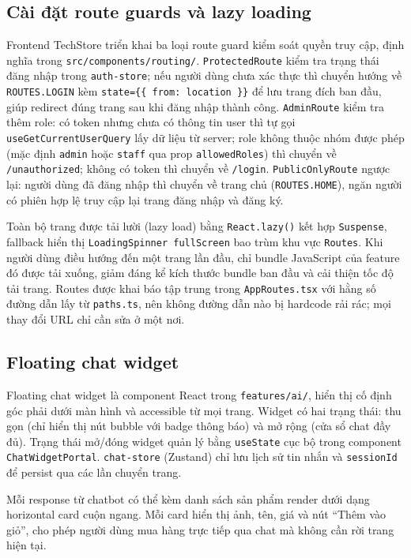 \subsection{Cài đặt route guards và lazy loading}
\label{sec:c4_route_guards}

Frontend TechStore triển khai ba loại route guard kiểm soát quyền truy cập, định nghĩa trong \texttt{src/components/routing/}. \texttt{ProtectedRoute} kiểm tra trạng thái đăng nhập trong \texttt{auth-store}; nếu người dùng chưa xác thực thì chuyển hướng về \texttt{ROUTES.LOGIN} kèm \texttt{state=\{\{ from: location \}\}} để lưu trang đích ban đầu, giúp redirect đúng trang sau khi đăng nhập thành công. \texttt{AdminRoute} kiểm tra thêm role: có token nhưng chưa có thông tin user thì tự gọi \texttt{useGetCurrentUserQuery} lấy dữ liệu từ server; role không thuộc nhóm được phép (mặc định \texttt{admin} hoặc \texttt{staff} qua prop \texttt{allowedRoles}) thì chuyển về \texttt{/unauthorized}; không có token thì chuyển về \texttt{/login}. \texttt{PublicOnlyRoute} ngược lại: người dùng đã đăng nhập thì chuyển về trang chủ (\texttt{ROUTES.HOME}), ngăn người có phiên hợp lệ truy cập lại trang đăng nhập và đăng ký.

Toàn bộ trang được tải lười (lazy load) bằng \texttt{React.lazy()} kết hợp \texttt{Suspense}, fallback hiển thị \texttt{LoadingSpinner fullScreen} bao trùm khu vực \texttt{Routes}. Khi người dùng điều hướng đến một trang lần đầu, chỉ bundle JavaScript của feature đó được tải xuống, giảm đáng kể kích thước bundle ban đầu và cải thiện tốc độ tải trang. Routes được khai báo tập trung trong \texttt{AppRoutes.tsx} với hằng số đường dẫn lấy từ \texttt{paths.ts}, nên không đường dẫn nào bị hardcode rải rác; mọi thay đổi URL chỉ cần sửa ở một nơi.

\subsection{Floating chat widget}

Floating chat widget là component React trong \texttt{features/ai/}, hiển thị cố định góc phải dưới màn hình và accessible từ mọi trang. Widget có hai trạng thái: thu gọn (chỉ hiển thị nút bubble với badge thông báo) và mở rộng (cửa sổ chat đầy đủ). Trạng thái mở/đóng widget quản lý bằng \texttt{useState} cục bộ trong component \texttt{ChatWidgetPortal}. \texttt{chat-store} (Zustand) chỉ lưu lịch sử tin nhắn và \texttt{sessionId} để persist qua các lần chuyển trang.

Mỗi response từ chatbot có thể kèm danh sách sản phẩm render dưới dạng horizontal card cuộn ngang. Mỗi card hiển thị ảnh, tên, giá và nút ``Thêm vào giỏ'', cho phép người dùng mua hàng trực tiếp qua chat mà không cần rời trang hiện tại.

